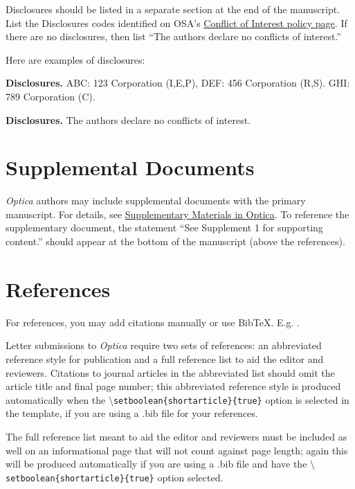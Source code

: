 \documentclass[9pt,twocolumn,twoside]{optica}
\begin{document}
Disclosures should be listed in a separate section at the end of the manuscript. List the Disclosures codes identified on OSA's \href{http://www.osapublishing.org/submit/review/conflicts-interest-policy.cfm}{Conflict of Interest policy page}. If there are no disclosures, then list ``The authors declare no conflicts of interest.''

Here are examples of disclosures:

\medskip

\noindent\textbf{Disclosures.} ABC: 123 Corporation (I,E,P), DEF: 456 Corporation (R,S). GHI: 789 Corporation (C).

\medskip

\noindent\textbf{Disclosures.} The authors declare no conflicts of interest.

\section*{Supplemental Documents}
\emph{Optica} authors may include supplemental documents with the primary manuscript. For details, see \href{http://www.opticsinfobase.org/submit/style/supplementary-materials-optica.cfm}{Supplementary Materials in Optica}. To reference the supplementary document, the statement ``See Supplement 1 for supporting content.'' should appear at the bottom of the manuscript (above the references).


\section*{References}

For references, you may add citations manually or use BibTeX. E.g. \cite{Zhang:14}.

Letter submissions to \emph{Optica} require two sets of references: an abbreviated reference style for publication and a full reference list to aid the editor and reviewers. Citations to journal articles in the abbreviated list should omit the article title and final page number; this abbreviated reference style is produced automatically when the \texttt{$\setminus$setboolean\{shortarticle\}\{true\}} option is selected in the template, if you are using a .bib file for your references.
 
The full reference list meant to aid the editor and reviewers must be included as well on an informational page that will not count against page length; again this will be produced automatically if you are using a .bib file and have the \texttt{$\setminus$setboolean\{shortarticle\}\{true\}} option selected.
\end{document}
